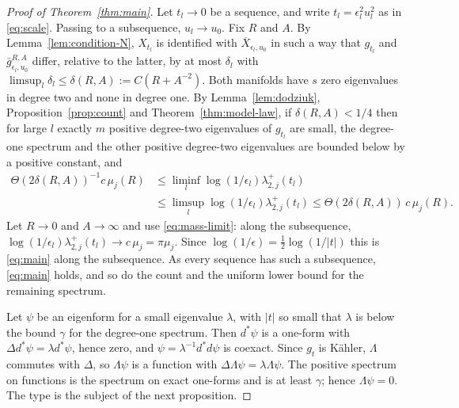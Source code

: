 \begin{proof}[Proof of Theorem~\ref{thm:main}]
Let $t_l\to0$ be a sequence, and write $t_l=\epsilon_l^2u_l^2$ as in
\eqref{eq:scale}. Passing to a subsequence, $u_l\to u_0$. Fix $R$ and
$A$. By Lemma~\ref{lem:condition-N}, $X_{t_l}$ is identified with
$\overline X_{\epsilon_l,u_0}$ in such a way that $g_{t_l}$ and
$\bar g^{R,A}_{\epsilon_l,u_0}$ differ, relative to the latter, by at
most $\delta_l$ with $\limsup_l\delta_l\le\delta(R,A):=C(R+A^{-2})$.
Both manifolds have $s$ zero eigenvalues in degree two and none in degree
one. By Lemma~\ref{lem:dodziuk}, Proposition~\ref{prop:count} and
Theorem~\ref{thm:model-law}, if $\delta(R,A)<1/4$ then for large $l$
exactly $m$ positive degree-two eigenvalues of $g_{t_l}$ are small, the
degree-one spectrum and the other positive degree-two eigenvalues are
bounded below by a positive constant, and
\begin{align*}
 \Theta(2\delta(R,A))^{-1}c\,\mu_j(R)
 &\le\liminf_l\log(1/\epsilon_l)\lambda^+_{2,j}(t_l)\\
 &\le\limsup_l\log(1/\epsilon_l)\lambda^+_{2,j}(t_l)
 \le\Theta(2\delta(R,A))\,c\,\mu_j(R).
\end{align*}
Let $R\to0$ and $A\to\infty$ and use \eqref{eq:mass-limit}: along the
subsequence, $\log(1/\epsilon_l)\lambda^+_{2,j}(t_l)\to c\,\mu_j=\pi\mu_j$.
Since $\log(1/\epsilon)=\tfrac12\log(1/|t|)$ this is \eqref{eq:main}
along the subsequence. As every sequence has such a subsequence,
\eqref{eq:main} holds, and so do the count and the uniform lower bound
for the remaining spectrum.

Let $\psi$ be an eigenform for a small eigenvalue $\lambda$, with $|t|$
so small that $\lambda$ is below the bound $\gamma$ for the degree-one
spectrum. Then $d^*\psi$ is a one-form with $\Delta d^*\psi=\lambda
d^*\psi$, hence zero, and $\psi=\lambda^{-1}d^*d\psi$ is coexact. Since
$g_t$ is K\"ahler, $\Lambda$ commutes with $\Delta$, so $\Lambda\psi$ is
a function with $\Delta\Lambda\psi=\lambda\Lambda\psi$. The positive
spectrum on functions is the spectrum on exact one-forms and is at least
$\gamma$; hence $\Lambda\psi=0$. The type is the subject of the next
proposition.
\end{proof}

